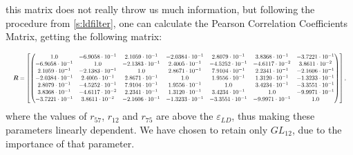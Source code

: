 this matrix does not really throw us much information, but following the procedure from \autoref{s:ldfilter}, one can calculate the Pearson Correlation Coefficients Matrix, getting the following matrix:

\begin{equation}
\resizebox{\textwidth}{!}{$\displaystyle
\boldsymbol{R} =  \left[\begin{pmatrix}
    1.0 & -6.9058 \cdot 10^{-1} & 2.1059 \cdot 10^{-1} & -2.0384 \cdot 10^{-1} & 2.8079 \cdot 10^{-1} & 3.8368 \cdot 10^{-1} & -3.7221 \cdot 10^{-1} \\
    -6.9058 \cdot 10^{-1} & 1.0 & -2.1383 \cdot 10^{-1} & 2.4005 \cdot 10^{-1} & -4.5252 \cdot 10^{-1} & -4.6117 \cdot 10^{-2} & 3.8611 \cdot 10^{-2} \\
    2.1059 \cdot 10^{-1} & -2.1383 \cdot 10^{-1} & 1.0 & 2.8671 \cdot 10^{-1} & 7.9104 \cdot 10^{-1} & 2.2341 \cdot 10^{-1} & -2.1606 \cdot 10^{-1} \\
    -2.0384 \cdot 10^{-1} & 2.4005 \cdot 10^{-1} & 2.8671 \cdot 10^{-1} & 1.0 & 1.9556 \cdot 10^{-1} & 1.3120 \cdot 10^{-1} & -1.3233 \cdot 10^{-1} \\
    2.8079 \cdot 10^{-1} & -4.5252 \cdot 10^{-1} & 7.9104 \cdot 10^{-1} & 1.9556 \cdot 10^{-1} & 1.0 & 3.4234 \cdot 10^{-1} & -3.3551 \cdot 10^{-1} \\
    3.8368 \cdot 10^{-1} & -4.6117 \cdot 10^{-2} & 2.2341 \cdot 10^{-1} & 1.3120 \cdot 10^{-1} & 3.4234 \cdot 10^{-1} & 1.0 & -9.9971 \cdot 10^{-1} \\
    -3.7221 \cdot 10^{-1} & 3.8611 \cdot 10^{-2} & -2.1606 \cdot 10^{-1} & -1.3233 \cdot 10^{-1} & -3.3551 \cdot 10^{-1} & -9.9971 \cdot 10^{-1} & 1.0
  \end{pmatrix}\right],
  $}
\end{equation}
where the values of $r_{57}$, $r_{12}$ and $r_{75}$ are above the $\varepsilon_{LD}$, thus making these parameters linearly dependent. We have chosen to retain only $GL_{12}$, due to the importance of that parameter.

